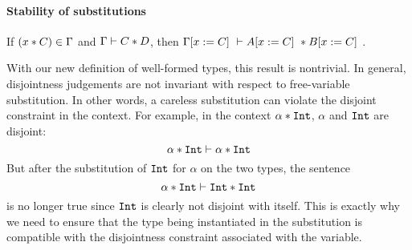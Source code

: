 \paragraph{Stability of substitutions}

\begin{lemma}
  \label{lemma:orthosubst}

  If $(x \disjoint C) \in \Gamma$ and $\jdis \Gamma C D$, 
  then $\jdis {\Gamma \subst C x} {A \subst C x} {B \subst C x}$.
\end{lemma}


With our new definition of well-formed types, this result is nontrivial.
In general, disjointness judgements are not invariant with respect to
free-variable substitution. In other words, a careless substitution can violate
the disjoint constraint in the context. For example, in the context $\alpha
\disjoint \tyint$, $\alpha$ and $\tyint$ are disjoint:
\[ \jdis {\alpha \disjoint \tyint} \alpha \tyint \]
But after the substitution of $\tyint$ for $\alpha$ on the two types, the sentence
\[ \jdis {\alpha \disjoint \tyint} \tyint \tyint \]
is no longer true since $\tyint$ is clearly not disjoint with itself.
This is exactly why we need to ensure that the type being instantiated in the substitution 
is compatible with the disjointness constraint associated with the variable. 

